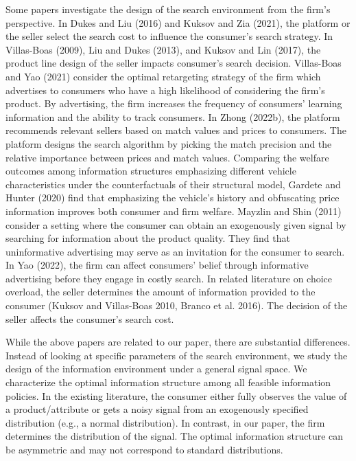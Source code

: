 \documentclass[11pt]{extarticle}
\begin{document}
Some papers investigate the design of the search environment from the firm's perspective. In Dukes and Liu (2016) and Kuksov and Zia (2021), the platform or the seller select the search cost to influence the consumer's search strategy. In Villas-Boas (2009), Liu and Dukes (2013), and Kuksov and Lin (2017), the product line design of the seller impacts consumer's search decision. Villas-Boas and Yao (2021) consider the optimal retargeting strategy of the firm which advertises to consumers who have a high likelihood of considering the firm's product. By advertising, the firm increases the frequency of consumers’ learning information and the ability to track consumers. In Zhong (2022b), the platform recommends relevant sellers based on match values and prices to consumers. The platform designs the search algorithm by picking the match precision and the relative importance between prices and match values. Comparing the welfare outcomes among information structures emphasizing different vehicle characteristics under the counterfactuals of their structural model, Gardete and Hunter (2020) find that emphasizing the vehicle's history and obfuscating price information improves both consumer and firm welfare. Mayzlin and Shin (2011) consider a setting where the consumer can obtain an exogenously given signal by searching for information about the product quality. They find that uninformative advertising may serve as an invitation for the consumer to search. In Yao (2022), the firm can affect consumers' belief through informative advertising before they engage in costly search. In related literature on choice overload, the seller determines the amount of information provided to the consumer (Kuksov and Villas-Boas 2010, Branco et al. 2016). The decision of the seller affects the consumer's search cost. 

While the above papers are related to our paper, there are substantial differences. Instead of looking at specific parameters of the search environment, we study the design of the information environment under a general signal space. We characterize the optimal information structure among all feasible information policies. In the existing literature, the consumer either fully observes the value of a product/attribute or gets a noisy signal from an exogenously specified distribution (e.g., a normal distribution). In contrast, in our paper, the firm determines the distribution of the signal. The optimal information structure can be asymmetric and may not correspond to standard distributions.
\end{document}
